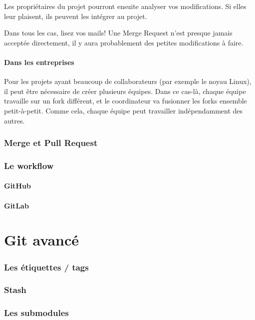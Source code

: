 \documentclass[10pt,a4paper]{article}
\begin{document}
Les propriétaires du projet pourront ensuite analyser vos modifications. Si elles leur plaisent, ils peuvent les intégrer au projet.

Dans tous les cas, lisez vos mails! Une Merge Request n'est presque jamais acceptée directement, il y aura probablement des petites modifications à faire.

\subsection{Dans les entreprises}

Pour les projets ayant beaucoup de collaborateurs (par exemple le noyau Linux), il peut être nécessaire de créer plusieurs équipes. Dans ce cas-là, chaque équipe travaille sur un fork différent, et le coordinateur va fusionner les forks ensemble petit-à-petit. Comme cela, chaque équipe peut travailler indépendamment des autres.

\section{Merge et Pull Request}

\section{Le workflow}

\subsection{GitHub}

\subsection{GitLab}

\part{Git avancé}

\section{Les étiquettes / tags\label{tags}}

\section{Stash\label{stash}}

\section{Les submodules\label{submodules}}
\end{document}
